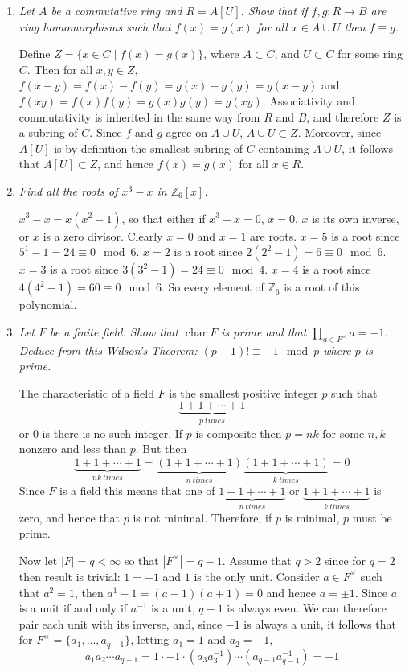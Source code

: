 \documentclass[10pt]{article}
\newcommand{\Z}{\mathbb{Z}}
\begin{document}
\begin{enumerate}
\item \emph{Let $A$ be a commutative ring and $R = A[U]$.  Show that if $f,g: R \rightarrow B$ are ring homomorphisms such that $f(x) = g(x)$ for all $x \in A \cup U$ then $f \equiv g$.}

Define $Z = \{ x \in C \mid f(x) = g(x)\}$, where $A \subset C$, and $U \subset C$ for some ring $C$.  Then for all $x,y \in Z$, $f(x-y) = f(x) - f(y) = g(x) - g(y) = g(x-y)$ and $f(xy) = f(x)f(y) = g(x)g(y) = g(xy)$.  Associativity and commutativity is inherited in the same way from $R$ and $B$, and therefore $Z$ is a subring of $C$.  Since $f$ and $g$ agree on $A \cup U$, $A \cup U \subset Z$.  Moreover, since $A[U]$ is by definition the smallest subring of $C$ containing $A \cup U$, it follows that $A[U] \subset Z$, and hence $f(x) = g(x)$ for all $x \in R$.

\item \emph{Find all the roots of $x^3 - x$ in $\Z_6[x]$.}

$x^3 - x = x(x^2 - 1)$, so that either if $x^3-x = 0$, $x = 0$, $x$ is its own inverse, or $x$ is a zero divisor.  Clearly $x=0$ and $x=1$ are roots.  $x=5$ is a root since $5^1 - 1 = 24 \equiv 0 \mod 6$.  $x=2$ is a root since $2(2^2-1) = 6 \equiv 0 \mod 6$.  $x = 3$ is a root since $3(3^2 - 1) = 24 \equiv 0 \mod 4$.  $x = 4$ is a root since $4(4^2-1) = 60 \equiv 0 \mod 6$.  So every element of $\Z_6$ is a root of this polynomial.

\item \emph{Let $F$ be a finite field.  Show that $\operatorname{char} F$ is prime and that $\prod_{a \in F^\times} a = -1$.  Deduce from this Wilson's Theorem: $(p-1)! \equiv -1 \mod p$ where $p$ is prime.}

The characteristic of a field $F$ is the smallest positive integer $p$ such that $$\underbrace{1+1+\cdots+1}_{p~times}$$ or $0$ is there is no such integer.  If $p$ is composite then $p=nk$ for some $n,k$ nonzero and less than $p$.  But then $$\underbrace{1+1+\cdots+1}_{nk~times} = \underbrace{(1+1+\cdots+1)}_{n~times}\underbrace{(1+1+\cdots+1)}_{k~times} = 0$$  Since $F$ is a field this means that one of $\underbrace{1+1+\cdots+1}_{n~times}$ or $\underbrace{1+1+\cdots+1}_{k~times}$ is zero, and hence that $p$ is not minimal.  Therefore, if $p$ is minimal, $p$ must be prime.

Now let $|F| = q < \infty$ so that $|F^\times| = q-1$.  Assume that $q > 2$ since for $q = 2$ then result is trivial: $1 = -1$ and $1$ is the only unit.  Consider $a \in F^\times$ such that $a^2 = 1$, then $a^1 - 1 = (a-1)(a+1) = 0$ and hence $a = \pm 1$.  Since $a$ is a unit if and only if $a^{-1}$ is a unit, $q-1$ is always even.  We can therefore pair each unit with its inverse, and, since $-1$ is always a unit, it follows that for $F^\times = \{a_1, \ldots, a_{q-1}\}$, letting $a_1 = 1$ and $a_2 = -1$,
\[
a_1a_2 \cdots a_{q-1} = 1 \cdot -1 \cdot (a_3a_3^{-1}) \cdots (a_{q-1}a_{q-1}^{-1}) = -1
\]


\end{enumerate}
\end{document}
